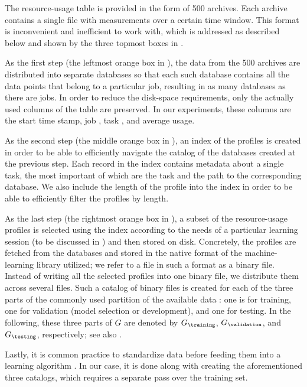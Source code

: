The resource-usage table is provided in the form of 500 archives. Each archive
contains a single file with measurements over a certain time window. This format
is inconvenient and inefficient to work with, which is addressed as described
below and shown by the three topmost boxes in .

As the first step (the leftmost orange box in ), the data
from the 500 archives are distributed into separate databases so that each such
database contains all the data points that belong to a particular job, resulting
in as many databases as there are jobs. In order to reduce the disk-space
requirements, only the actually used columns of the table are preserved. In our
experiments, these columns are the start time stamp, job , task ,
and average  usage.

As the second step (the middle orange box in ), an index of
the profiles is created in order to be able to efficiently navigate the catalog
of the databases created at the previous step. Each record in the index contains
metadata about a single task, the most important of which are the task 
and the path to the corresponding database. We also include the length of the
profile into the index in order to be able to efficiently filter the profiles by
length.

As the last step (the rightmost orange box in ), a subset
of the resource-usage profiles is selected using the index according to the
needs of a particular learning session (to be discussed in )
and then stored on disk. Concretely, the profiles are fetched from the databases
and stored in the native format of the machine-learning library utilized; we
refer to a file in such a format as a binary file. Instead of writing all the
selected profiles into one binary file, we distribute them across several files.
Such a catalog of binary files is created for each of the three parts of the
commonly used partition of the available data \cite{hastie2013}: one is for
training, one for validation (model selection or development), and one for
testing. In the following, these three parts of $G$ are denoted by
$G_\training$, $G_\validation$, and $G_\testing$, respectively; see also
.

Lastly, it is common practice to standardize data before feeding them into a
learning algorithm \cite{hastie2013}. In our case, it is done along with
creating the aforementioned three catalogs, which requires a separate pass over
the training set.

